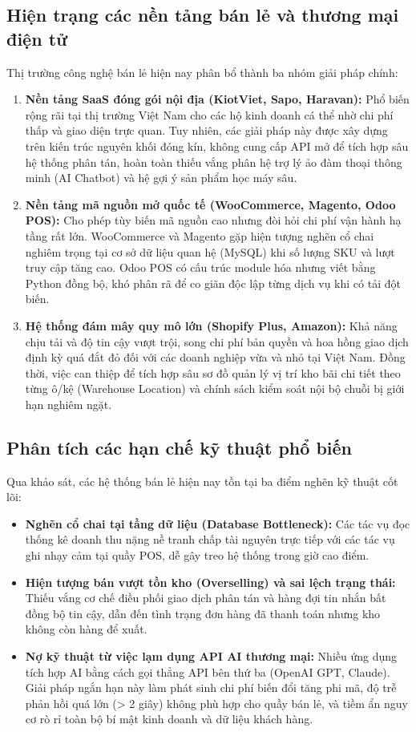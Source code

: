 \documentclass[12pt,a4paper]{report}
\begin{document}
\subsection{Hiện trạng các nền tảng bán lẻ và thương mại điện tử}
Thị trường công nghệ bán lẻ hiện nay phân bổ thành ba nhóm giải pháp chính:
\begin{enumerate}
    \item \textbf{Nền tảng SaaS đóng gói nội địa (KiotViet, Sapo, Haravan):} Phổ biến rộng rãi tại thị trường Việt Nam cho các hộ kinh doanh cá thể nhờ chi phí thấp và giao diện trực quan. Tuy nhiên, các giải pháp này được xây dựng trên kiến trúc nguyên khối đóng kín, không cung cấp API mở để tích hợp sâu hệ thống phân tán, hoàn toàn thiếu vắng phân hệ trợ lý ảo đàm thoại thông minh (AI Chatbot) và hệ gợi ý sản phẩm học máy sâu.
    \item \textbf{Nền tảng mã nguồn mở quốc tế (WooCommerce, Magento, Odoo POS):} Cho phép tùy biến mã nguồn cao nhưng đòi hỏi chi phí vận hành hạ tầng rất lớn. WooCommerce và Magento gặp hiện tượng nghẽn cổ chai nghiêm trọng tại cơ sở dữ liệu quan hệ (MySQL) khi số lượng SKU và lượt truy cập tăng cao. Odoo POS có cấu trúc module hóa nhưng viết bằng Python đồng bộ, khó phân rã để co giãn độc lập từng dịch vụ khi có tải đột biến.
    \item \textbf{Hệ thống đám mây quy mô lớn (Shopify Plus, Amazon):} Khả năng chịu tải và độ tin cậy vượt trội, song chi phí bản quyền và hoa hồng giao dịch định kỳ quá đắt đỏ đối với các doanh nghiệp vừa và nhỏ tại Việt Nam. Đồng thời, việc can thiệp để tích hợp sâu sơ đồ quản lý vị trí kho bãi chi tiết theo từng ô/kệ (Warehouse Location) và chính sách kiểm soát nội bộ chuỗi bị giới hạn nghiêm ngặt.
\end{enumerate}

\subsection{Phân tích các hạn chế kỹ thuật phổ biến}
Qua khảo sát, các hệ thống bán lẻ hiện nay tồn tại ba điểm nghẽn kỹ thuật cốt lõi:
\begin{itemize}
    \item \textbf{Nghẽn cổ chai tại tầng dữ liệu (Database Bottleneck):} Các tác vụ đọc thống kê doanh thu nặng nề tranh chấp tài nguyên trực tiếp với các tác vụ ghi nhạy cảm tại quầy POS, dễ gây treo hệ thống trong giờ cao điểm.
    \item \textbf{Hiện tượng bán vượt tồn kho (Overselling) và sai lệch trạng thái:} Thiếu vắng cơ chế điều phối giao dịch phân tán và hàng đợi tin nhắn bất đồng bộ tin cậy, dẫn đến tình trạng đơn hàng đã thanh toán nhưng kho không còn hàng để xuất.
    \item \textbf{Nợ kỹ thuật từ việc lạm dụng API AI thương mại:} Nhiều ứng dụng tích hợp AI bằng cách gọi thẳng API bên thứ ba (OpenAI GPT, Claude). Giải pháp ngắn hạn này làm phát sinh chi phí biến đổi tăng phi mã, độ trễ phản hồi quá lớn (> 2 giây) không phù hợp cho quầy bán lẻ, và tiềm ẩn nguy cơ rò rỉ toàn bộ bí mật kinh doanh và dữ liệu khách hàng.
\end{itemize}
\end{document}
